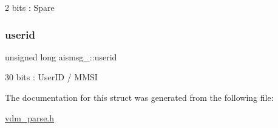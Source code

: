 2 bits \+: Spare 

\mbox{\label{structaismsg__13_add4a6b65ea2131347397e18a8bff4aba}} 
\subsubsection{\texorpdfstring{userid}{userid}}
{\footnotesize\ttfamily unsigned long aismsg\+\_\+::userid}



30 bits \+: User\+ID / M\+M\+SI 



The documentation for this struct was generated from the following file\+:\begin{DoxyCompactItemize}
\item 
\mbox{\hyperlink{vdm__parse_8h}{vdm\+\_\+parse.\+h}}\end{DoxyCompactItemize}
